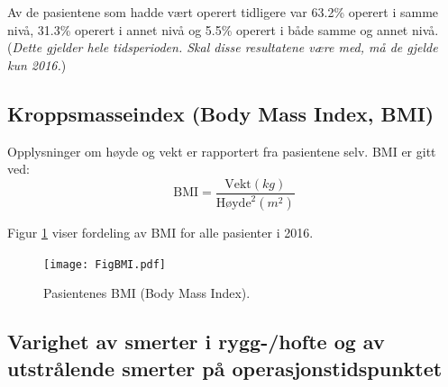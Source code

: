 \documentclass [norsk,a4paper,twoside]{article}\usepackage[]{graphicx}\usepackage[]{color}
\begin{document}
Av de pasientene som hadde vært operert tidligere var 63.2\% 
operert i samme nivå, 31.3\% 
operert i annet nivå og 5.5\% 
operert i både samme og annet nivå. 
(\textit{Dette gjelder hele tidsperioden. Skal disse resultatene være med, må de gjelde kun 2016.})


\subsection{Kroppsmasseindex (Body Mass Index, BMI)}
Opplysninger om høyde og vekt er rapportert fra pasientene selv. BMI er gitt ved:
\begin{equation*}
	\text{BMI} = \frac{\text{Vekt}(kg)}{\text{Høyde}^2 (m^2)}
\end{equation*} 

Figur \ref{fig:BMI} viser fordeling av BMI for alle pasienter i 2016. 




\begin{figure}[ht]
	\centering \texttt{[image: FigBMI.pdf]}
	\caption{\label{fig:BMI} Pasientenes BMI (Body Mass Index).}
\end{figure}



\clearpage


\subsection{Varighet av smerter i rygg-/hofte og av utstrålende smerter på operasjonstidspunktet}
\end{document}
